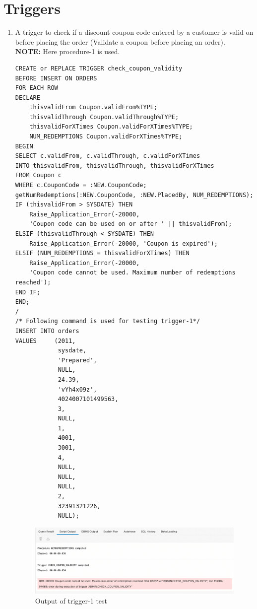 \documentclass[12pt,letterpaper]{article}
\begin{document}
\section{Triggers}
\begin{enumerate}
    \item A trigger to check if a discount coupon code entered by a customer is valid on before placing the order (Validate a coupon before placing an order). \\ \textbf{NOTE:} Here procedure-1 is used.
    \begin{lstlisting}
CREATE or REPLACE TRIGGER check_coupon_validity
BEFORE INSERT ON ORDERS
FOR EACH ROW
DECLARE
    thisvalidFrom Coupon.validFrom%TYPE;
    thisvalidThrough Coupon.validThrough%TYPE;
    thisvalidForXTimes Coupon.validForXTimes%TYPE;
    NUM_REDEMPTIONS Coupon.validForXTimes%TYPE;
BEGIN
SELECT c.validFrom, c.validThrough, c.validForXTimes 
INTO thisvalidFrom, thisvalidThrough, thisvalidForXTimes
FROM Coupon c
WHERE c.CouponCode = :NEW.CouponCode;
getNumRedemptions(:NEW.CouponCode, :NEW.PlacedBy, NUM_REDEMPTIONS);
IF (thisvalidFrom > SYSDATE) THEN
    Raise_Application_Error(-20000, 
    'Coupon code can be used on or after ' || thisvalidFrom);
ELSIF (thisvalidThrough < SYSDATE) THEN
    Raise_Application_Error(-20000, 'Coupon is expired');
ELSIF (NUM_REDEMPTIONS = thisvalidForXTimes) THEN
    Raise_Application_Error(-20000, 
    'Coupon code cannot be used. Maximum number of redemptions reached');
END IF;
END;
/
/* Following command is used for testing trigger-1*/
INSERT INTO orders
VALUES     (2011,
            sysdate,
            'Prepared',
            NULL,
            24.39,
            'vYh4x09z',
            4024007101499563,
            3,
            NULL,
            1,
            4001,
            3001,
            4,
            NULL,
            NULL,
            NULL,
            2,
            32391321226,
            NULL); 

    \end{lstlisting}
    \begin{figure}[H]
 \begin{center}
     \includegraphics[scale=1]{figures/Picture21.png}
     \caption{Output of trigger-1 test}
     \label{fig:2b_graph_n}
 \end{center}
\end{figure}


\end{enumerate}
\end{document}
